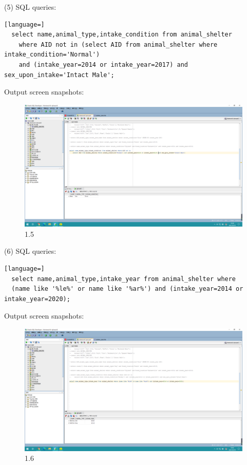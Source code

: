 \documentclass[]{article}
\begin{document}
(5) SQL queries:
	\begin{lstlisting}[language=] 
  select name,animal_type,intake_condition from animal_shelter
    where AID not in (select AID from animal_shelter where intake_condition='Normal') 
    and (intake_year=2014 or intake_year=2017) and sex_upon_intake='Intact Male';
	\end{lstlisting} 
	Output screen snapshots:
	\begin{figure}[H]
		\centering
		\includegraphics[width=0.88\linewidth]{./document-H1/exercise1/1.5}
		\caption{1.5}
		\label{1.5}
	\end{figure}

(6) SQL queries:
	\begin{lstlisting}[language=] 
  select name,animal_type,intake_year from animal_shelter where 
  (name like '%le%' or name like '%ar%') and (intake_year=2014 or intake_year=2020);
	\end{lstlisting} 
	Output screen snapshots:
	\begin{figure}[H]
		\centering
		\includegraphics[width=0.88\linewidth]{./document-H1/exercise1/1.6}
		\caption{1.6}
		\label{1.6}
	\end{figure}
\end{document}
